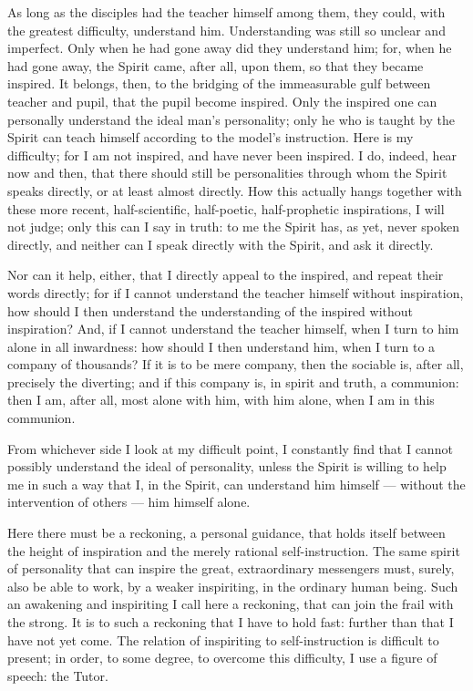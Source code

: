 \documentclass[12pt,a4paper]{book}
\begin{document}
As long as the disciples had the teacher himself among them, they could, with the greatest difficulty, understand him. Understanding was still so unclear and imperfect. Only when he had gone away did they understand him; for, when he had gone away, the Spirit came, after all, upon them, so that they became inspired. It belongs, then, to the bridging of the immeasurable gulf between teacher and pupil, that the pupil become inspired. Only the inspired one can personally understand the ideal man's personality; only he who is taught by the Spirit can teach himself according to the model's instruction.
Here is my difficulty; for I am not inspired, and have never been inspired. I do, indeed, hear now and then, that there should still be personalities through whom the Spirit speaks directly, or at least almost directly. How this actually hangs together with these more recent, half-scientific, half-poetic, half-prophetic inspirations, I will not judge; only this can I say in truth: to me the Spirit has, as yet, never spoken directly, and neither can I speak directly with the Spirit, and ask it directly.

Nor can it help, either, that I directly appeal to the inspired, and repeat their words directly; for if I cannot understand the teacher himself without inspiration, how should I then understand the understanding of the inspired without inspiration? And, if I cannot understand the teacher himself, when I turn to him alone in all inwardness: how should I then understand him, when I turn to a company of thousands? If it is to be mere company, then the sociable is, after all, precisely the diverting; and if this company is, in spirit and truth, a communion: then I am, after all, most alone with him, with him alone, when I am in this communion.

From whichever side I look at my difficult point, I constantly find that I cannot possibly understand the ideal of personality, unless the Spirit is willing to help me in such a way that I, in the Spirit, can understand him himself --- without the intervention of others --- him himself alone.

Here there must be a reckoning, a personal guidance, that holds itself between the height of inspiration and the merely rational self-instruction. The same spirit of personality that can inspire the great, extraordinary messengers must, surely, also be able to work, by a weaker inspiriting, in the ordinary human being. Such an awakening and inspiriting I call here a reckoning, that can join the frail with the strong. It is to such a reckoning that I have to hold fast: further than that I have not yet come.
The relation of inspiriting to self-instruction is difficult to present; in order, to some degree, to overcome this difficulty, I use a figure of speech: the Tutor.
\end{document}
